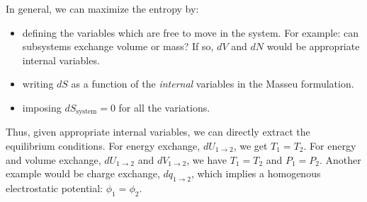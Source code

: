 \documentclass[12pt]{article}
\begin{document}
In general, we can maximize the entropy by:
\begin{itemize}
\item defining the variables which are free to move in the system. For example: can subsystems exchange volume or mass? If so, $dV$ and $dN$ would be appropriate internal variables.
\item writing $dS$ as a function of the \emph{internal} variables in the Masseu formulation.
\item imposing $dS_\text{system} = 0$ for all the variations.
\end{itemize}
Thus, given appropriate internal variables, we can directly extract the equilibrium conditions.  For energy exchange, $dU_{1\rightarrow 2}$, we get $T_1 = T_2$.  For energy and volume exchange, $dU_{1\rightarrow 2}$ and $dV_{1\rightarrow 2}$, we have $T_1 = T_2$ and $P_1 = P_2$.  Another example would be charge exchange, $dq_{1\rightarrow 2}$, which implies a homogenous electrostatic potential: $\phi_1 = \phi_2$.



\end{document}
